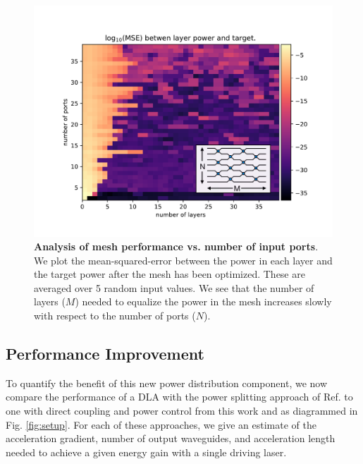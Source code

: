 \begin{figure}
\centering
\includegraphics[width=1\columnwidth]{figures/MZI_scale}
\caption{\label{fig:scaling} \textbf{Analysis of mesh performance vs. number of input ports}.  We plot the mean-squared-error between the power in each layer and the target power after the mesh has been optimized.  These are averaged over 5 random input values.  We see that the number of layers ($M$) needed to equalize the power in the mesh increases slowly with respect to the number of ports ($N$).}
\end{figure}

\subsection{\label{sec:DLA_analysis}Performance Improvement}

To quantify the benefit of this new power distribution component, we now compare the performance of a DLA with the power splitting approach of Ref. \cite{hughes_-chip_2018} to one with direct coupling and power control from this work and as diagrammed in Fig. \ref{fig:setup}.  For each of these approaches, we give an estimate of the acceleration gradient, number of output waveguides, and acceleration length needed to achieve a given energy gain with a single driving laser.  

